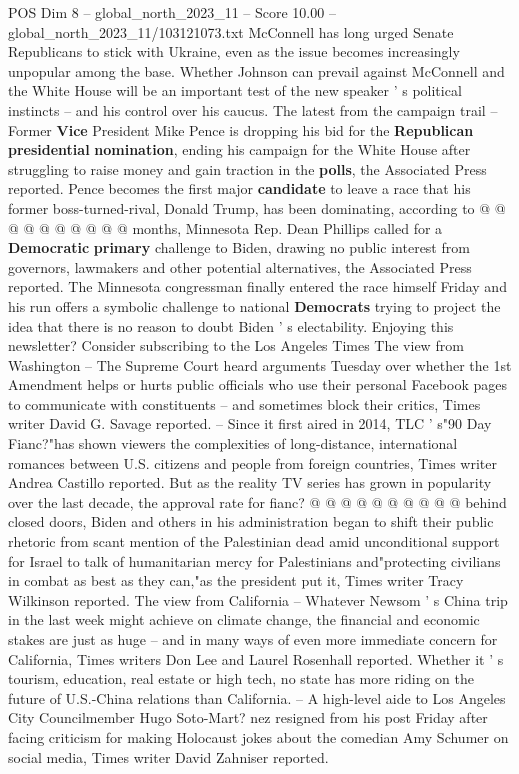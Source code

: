 \begin{textsample}{POS Dim 8 – global\_north\_2023\_11 – Score 10.00 – global\_north\_2023\_11/103121073.txt}
McConnell has long urged Senate Republicans to stick with Ukraine, even as the issue becomes increasingly unpopular among the base.
Whether Johnson can prevail against McConnell and the White House will be an important test of the new speaker ' s political instincts -- and his control over his caucus.
The latest from the campaign trail -- Former \textbf{Vice} President Mike Pence is dropping his bid for the \textbf{Republican} \textbf{presidential} \textbf{nomination}, ending his campaign for the White House after struggling to raise money and gain traction in the \textbf{polls}, the Associated Press reported.
Pence becomes the first major \textbf{candidate} to leave a race that his former boss-turned-rival, Donald Trump, has been dominating, according to @ @ @ @ @ @ @ @ @ @ months, Minnesota Rep.
Dean Phillips called for a \textbf{Democratic} \textbf{primary} challenge to Biden, drawing no public interest from governors, lawmakers and other potential alternatives, the Associated Press reported.
The Minnesota congressman finally entered the race himself Friday and his run offers a symbolic challenge to national \textbf{Democrats} trying to project the idea that there is no reason to doubt Biden ' s electability.
Enjoying this newsletter?
Consider subscribing to the Los Angeles Times The view from Washington -- The Supreme Court heard arguments Tuesday over whether the 1st Amendment helps or hurts public officials who use their personal Facebook pages to communicate with constituents -- and sometimes block their critics, Times writer David G.
Savage reported. -- Since it first aired in 2014, TLC ' s"90 Day Fianc?"has shown viewers the complexities of long-distance, international romances between U.S. citizens and people from foreign countries, Times writer Andrea Castillo reported.
But as the reality TV series has grown in popularity over the last decade, the approval rate for fianc? @ @ @ @ @ @ @ @ @ @ behind closed doors, Biden and others in his administration began to shift their public rhetoric from scant mention of the Palestinian dead amid unconditional support for Israel to talk of humanitarian mercy for Palestinians and"protecting civilians in combat as best as they can,"as the president put it, Times writer Tracy Wilkinson reported.
The view from California -- Whatever Newsom ' s China trip in the last week might achieve on climate change, the financial and economic stakes are just as huge -- and in many ways of even more immediate concern for California, Times writers Don Lee and Laurel Rosenhall reported.
Whether it ' s tourism, education, real estate or high tech, no state has more riding on the future of U.S.-China relations than California. -- A high-level aide to Los Angeles City Councilmember Hugo Soto-Mart? nez resigned from his post Friday after facing criticism for making Holocaust jokes about the comedian Amy Schumer on social media, Times writer David Zahniser reported.

\end{textsample}

